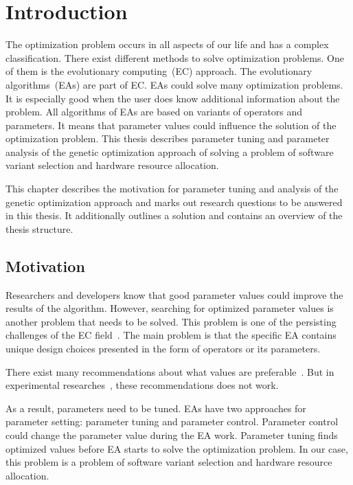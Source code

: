 \chapter{Introduction}\label{intro}
The optimization problem occurs in all aspects of our life and has a complex classification. There exist different methods to solve optimization problems. One of them is the evolutionary computing~(EC) approach. The evolutionary algorithms~(EAs) are part of EC. EAs could solve many optimization problems. It is especially good when the user does know additional information about the problem. All algorithms of EAs are based on variants of operators and parameters. It means that parameter values could influence the solution of the optimization problem. This thesis describes parameter tuning and parameter analysis of the genetic optimization approach of solving a problem of software variant selection and hardware resource allocation.  

This chapter describes the motivation for parameter tuning and analysis of the genetic optimization approach and marks out research questions to be answered in this thesis. It additionally outlines a solution and contains an overview of the thesis structure.

\section{Motivation}
Researchers and developers know that good parameter values could improve the results of the algorithm. However, searching for optimized parameter values is another problem that needs to be solved. This problem is one of the persisting challenges of the EC field~\cite{smit2010parameter}. The main problem is that the specific EA contains unique design choices presented in the form of operators or its parameters. 

There exist many recommendations about what values are preferable~\cite{de2007parameter, sipper2018investigating}.  But in experimental researches~\cite{de2007parameter, shahookar1990genetic, gockel1997influencing}, these recommendations does not work. 

As a result, parameters need to be tuned. EAs have two approaches for parameter setting: parameter tuning and parameter control. Parameter control could change the parameter value during the EA work. Parameter tuning finds optimized values before EA starts to solve the optimization problem. In our case, this problem is a problem of software variant selection and hardware resource allocation. 

